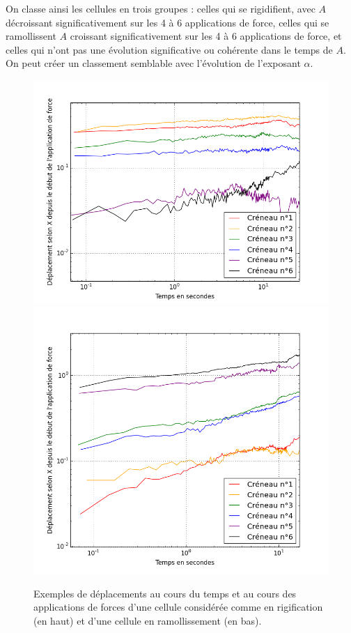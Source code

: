 \documentclass{report}
\begin{document}
On classe ainsi les cellules en trois groupes : celles qui se rigidifient, avec $A$ décroissant significativement sur les 4 à 6 applications de force, celles qui se ramollissent $A$ croissant significativement sur les 4 à 6 applications de force, et celles qui n'ont pas une évolution significative ou cohérente dans le temps de $A$. 
On peut créer un classement semblable avec l'évolution de l'exposant $\alpha$. 
\begin{figure}
\includegraphics[scale=0.33]{Figures/Rigidification_exemple_s2c2.png} 
\includegraphics[scale=0.3]{Figures/Ramollissement_exemple_s2c19.png} 
\caption{Exemples de déplacements au cours du temps et au cours des applications de forces d'une cellule considérée comme en rigification (en haut) et d'une cellule en ramollissement (en bas). }
\end{figure}
\end{document}
